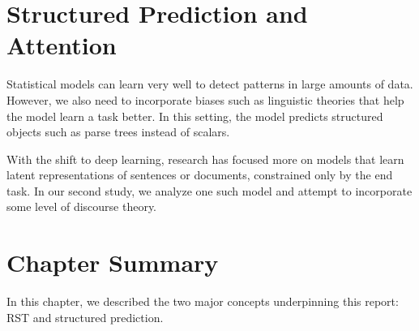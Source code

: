 \section{Structured Prediction and Attention}
\label{sec:structuredpred}
Statistical models can learn very well to detect patterns in large amounts of data. However, we also need to incorporate biases such as linguistic theories that help the model learn a task better. In this setting, the model predicts structured objects such as parse trees instead of scalars. 

With the shift to deep learning, research has focused more on models that learn latent representations of sentences or documents, constrained only by the end task. In our second study, we analyze one such model and attempt to incorporate some level of discourse theory. 

\section{Chapter Summary}

In this chapter, we described the two major concepts underpinning this report: RST and structured prediction. 


